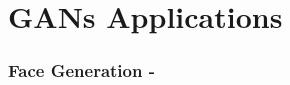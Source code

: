 \documentclass{beamer}
\begin{document}
\section{GANs Applications}



{
	\begin{frame}
		\frametitle{Face Generation - \cite{karrasProgressiveGrowingGANs2017}}
	\end{frame}
}
\end{document}
